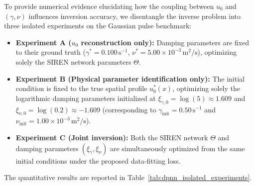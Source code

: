 \documentclass{Configuration_Files/PoliMi3i_thesis}
\newif\ifshowthesischanges
\DeclareRobustCommand{\thesischange}[2]{%
    \ifshowthesischanges
        \textcolor{#1}{#2}%
    \else
        #2%
    \fi
}
\def\thesischange#1#2{#2}%
\begin{document}
\thesischange{red}{To provide numerical evidence elucidating how the coupling between $u_0$ and $(\gamma, \nu)$ influences inversion accuracy, we disentangle the inverse problem into three isolated experiments on the Gaussian pulse benchmark:
\begin{itemize}
    \item \textbf{Experiment A ($u_0$ reconstruction only):} Damping parameters are fixed to their ground truth ($\gamma^* = 0.100\,\mathrm{s}^{-1}$, $\nu^* = 5.00 \times 10^{-3}\,\mathrm{m}^2/\mathrm{s}$), optimizing solely the SIREN network parameters $\Theta$.
    \item \textbf{Experiment B (Physical parameter identification only):} The initial condition is fixed to the true spatial profile $u_0^*(x)$, optimizing solely the logarithmic damping parameters initialized at $\xi_{\gamma,0} = \log(5) \approx 1.609$ and $\xi_{\nu,0} = \log(0.2) \approx -1.609$ (corresponding to $\gamma_{\mathrm{init}} = 0.50\,\mathrm{s}^{-1}$ and $\nu_{\mathrm{init}} = 1.00 \times 10^{-3}\,\mathrm{m}^2/\mathrm{s}$).
    \item \textbf{Experiment C (Joint inversion):} Both the SIREN network $\Theta$ and damping parameters $(\xi_\gamma, \xi_\nu)$ are simultaneously optimized from the same initial conditions under the proposed data-fitting loss.
\end{itemize}
The quantitative results are reported in Table~\ref{tab:dpnn_isolated_experiments}.}

\begin{table}[H]
\centering
\small
\caption{\thesischange{red}{Disentangled analysis of the inverse problem on the Gaussian benchmark, comparing: (Exp~A) initial condition reconstruction with physical parameters fixed to ground truth; (Exp~B) physical parameter identification with initial condition fixed to ground truth; and (Exp~C) joint reconstruction where both the initial state and damping parameters are simultaneously unknown.}}
\label{tab:dpnn_isolated_experiments}
\end{table}
\end{document}
